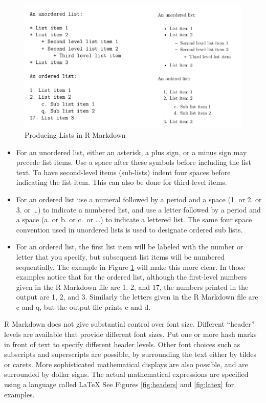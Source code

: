 \documentclass[
]{krantz}
\begin{document}
\begin{figure}

{\centering \includegraphics[width=1\linewidth]{../figures/listsPic} 

}

\caption{Producing Lists in R Markdown}\label{fig:lists}
\end{figure}

\begin{itemize}
\item
  For an unordered list, either an asterisk, a plus sign, or a minus sign may precede list items. Use a space after these symbols before including the list text. To have second-level items (sub-lists) indent four spaces before indicating the list item. This can also be done for third-level items.
\item
  For an ordered list use a numeral followed by a period and a space (1. or 2. or 3. or \ldots) to indicate a numbered list, and use a letter followed by a period and a space (a. or b. or c.~or \ldots) to indicate a lettered list. The same four space convention used in unordered lists is used to designate ordered sub lists.
\item
  For an ordered list, the first list item will be labeled with the number or letter that you specify, but subsequent list items will be numbered sequentially. The example in Figure \ref{fig:lists} will make this more clear. In those examples notice that for the ordered list, although the first-level numbers given in the R Markdown file are 1, 2, and 17, the numbers printed in the output are 1, 2, and 3. Similarly the letters given in the R Markdown file are c and q, but the output file prints c and d.~
\end{itemize}

R Markdown does not give substantial control over font size. Different ``header'' levels are available that provide different font sizes. Put one or more hash marks in front of text to specify different header levels. Other font choices such as subscripts and superscripts are possible, by surrounding the text either by tildes or carets. More sophisticated mathematical displays are also possible, and are surrounded by dollar signs. The actual mathematical expressions are specified using a language called LaTeX See Figures \ref{fig:headers} and \ref{fig:latex} for examples.
\end{document}
